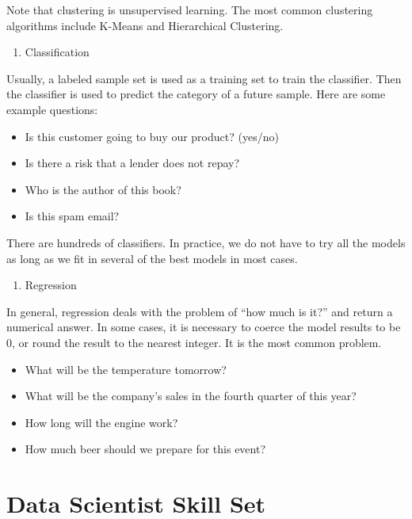 \documentclass[12pt,]{krantz}
\providecommand{\tightlist}{%
  \setlength{\itemsep}{0pt}\setlength{\parskip}{0pt}}
\theoremstyle{definition}
\theoremstyle{definition}
\theoremstyle{remark}
\begin{document}
Note that clustering is unsupervised learning. The most common
clustering algorithms include K-Means and Hierarchical Clustering.

\begin{enumerate}
\def\labelenumi{\arabic{enumi}.}
\setcounter{enumi}{3}
\tightlist
\item
  Classification
\end{enumerate}

Usually, a labeled sample set is used as a training set to train the
classifier. Then the classifier is used to predict the category of a
future sample. Here are some example questions:

\begin{itemize}
\tightlist
\item
  Is this customer going to buy our product? (yes/no)
\item
  Is there a risk that a lender does not repay?
\item
  Who is the author of this book?
\item
  Is this spam email?
\end{itemize}

There are hundreds of classifiers. In practice, we do not have to try
all the models as long as we fit in several of the best models in most
cases.

\begin{enumerate}
\def\labelenumi{\arabic{enumi}.}
\setcounter{enumi}{4}
\tightlist
\item
  Regression
\end{enumerate}

In general, regression deals with the problem of ``how much is it?'' and
return a numerical answer. In some cases, it is necessary to coerce the
model results to be 0, or round the result to the nearest integer. It is
the most common problem.

\begin{itemize}
\tightlist
\item
  What will be the temperature tomorrow?
\item
  What will be the company's sales in the fourth quarter of this year?
\item
  How long will the engine work?
\item
  How much beer should we prepare for this event?
\end{itemize}

\section{Data Scientist Skill Set}\label{data-scientist-skill-set}
\end{document}

